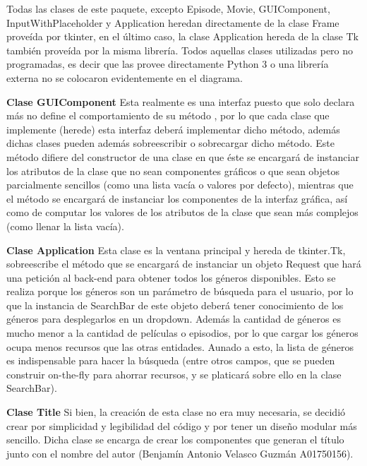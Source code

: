 Todas las clases de este paquete, excepto Episode, Movie, GUIComponent, InputWithPlaceholder y Application heredan directamente de la clase Frame proveída por tkinter, en el último caso, la clase Application hereda de la clase Tk también proveída por la misma librería. Todos aquellas clases utilizadas pero no programadas, es decir que las provee directamente Python 3 o una librería externa no se colocaron evidentemente en el diagrama.

\textbf{Clase GUIComponent}\newline
Esta realmente es una interfaz puesto que solo declara más no define el comportamiento de su método , por lo que cada clase que implemente (herede) esta interfaz deberá implementar dicho método, además dichas clases pueden además sobreescribir o sobrecargar dicho método.
Este método difiere del constructor de una clase en que éste se encargará de instanciar los atributos de la clase que no sean componentes gráficos o que sean objetos parcialmente sencillos (como una lista vacía o valores por defecto), mientras que el método  se encargará de instanciar los componentes de la interfaz gráfica, así como de computar los valores de los atributos de la clase que sean más complejos (como llenar la lista vacía).

\textbf{Clase Application}\newline
Esta clase es la ventana principal y hereda de tkinter.Tk, sobreescribe el método  que se encargará de instanciar un objeto Request que hará una petición al back-end para obtener todos los géneros disponibles.
Esto se realiza porque los géneros son un parámetro de búsqueda para el usuario, por lo que la instancia de SearchBar de este objeto deberá tener conocimiento de los géneros para desplegarlos en un dropdown.
Además la cantidad de géneros es mucho menor a la cantidad de películas o episodios, por lo que cargar los géneros ocupa menos recursos que las otras entidades. Aunado a esto, la lista de géneros es indispensable para hacer la búsqueda (entre otros campos, que se pueden construir on-the-fly para ahorrar recursos, y se platicará sobre ello en la clase SearchBar).

\textbf{Clase Title}\newline
Si bien, la creación de esta clase no era muy necesaria, se decidió crear por simplicidad y legibilidad del código y por tener un diseño modular más sencillo. Dicha clase se encarga de crear los componentes que generan el título junto con el nombre del autor (Benjamín Antonio Velasco Guzmán A01750156).

